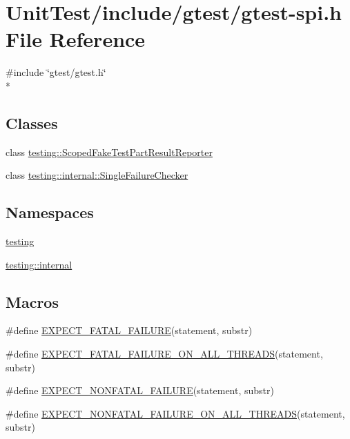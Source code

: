 \hypertarget{gtest-spi_8h}{\section{Unit\+Test/include/gtest/gtest-\/spi.h File Reference}
\label{gtest-spi_8h}
}
{\ttfamily \#include \char`\"{}gtest/gtest.\+h\char`\"{}}\\*
\subsection*{Classes}
\begin{DoxyCompactItemize}
\item 
class \hyperlink{classtesting_1_1_scoped_fake_test_part_result_reporter}{testing\+::\+Scoped\+Fake\+Test\+Part\+Result\+Reporter}
\item 
class \hyperlink{classtesting_1_1internal_1_1_single_failure_checker}{testing\+::internal\+::\+Single\+Failure\+Checker}
\end{DoxyCompactItemize}
\subsection*{Namespaces}
\begin{DoxyCompactItemize}
\item 
 \hyperlink{namespacetesting}{testing}
\item 
 \hyperlink{namespacetesting_1_1internal}{testing\+::internal}
\end{DoxyCompactItemize}
\subsection*{Macros}
\begin{DoxyCompactItemize}
\item 
\#define \hyperlink{gtest-spi_8h_a819a3fd7f8b8cf24b6f1b3a26708973d}{E\+X\+P\+E\+C\+T\+\_\+\+F\+A\+T\+A\+L\+\_\+\+F\+A\+I\+L\+U\+R\+E}(statement, substr)
\item 
\#define \hyperlink{gtest-spi_8h_ad8aac5bc859b2ddc07583636ae4f45cf}{E\+X\+P\+E\+C\+T\+\_\+\+F\+A\+T\+A\+L\+\_\+\+F\+A\+I\+L\+U\+R\+E\+\_\+\+O\+N\+\_\+\+A\+L\+L\+\_\+\+T\+H\+R\+E\+A\+D\+S}(statement, substr)
\item 
\#define \hyperlink{gtest-spi_8h_a8376fd6821bd88fd806697355e79e138}{E\+X\+P\+E\+C\+T\+\_\+\+N\+O\+N\+F\+A\+T\+A\+L\+\_\+\+F\+A\+I\+L\+U\+R\+E}(statement, substr)
\item 
\#define \hyperlink{gtest-spi_8h_a9f4cf1f150fe9facfc4cbf0bae646ee9}{E\+X\+P\+E\+C\+T\+\_\+\+N\+O\+N\+F\+A\+T\+A\+L\+\_\+\+F\+A\+I\+L\+U\+R\+E\+\_\+\+O\+N\+\_\+\+A\+L\+L\+\_\+\+T\+H\+R\+E\+A\+D\+S}(statement, substr)
\end{DoxyCompactItemize}


